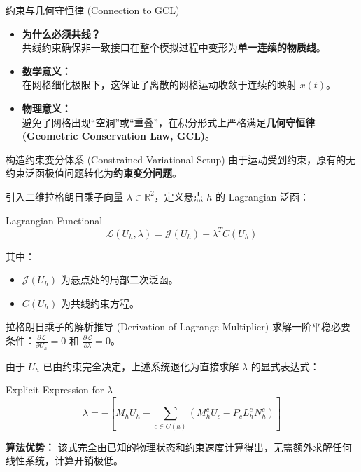 \documentclass{beamer}
\begin{document}
	\begin{frame}{约束与几何守恒律 (Connection to GCL)}
		\begin{itemize}
			\item \textbf{为什么必须共线？} \\
			共线约束确保非一致接口在整个模拟过程中变形为\textbf{单一连续的物质线}。
			\vspace{0.3cm}
			\item \textbf{数学意义：} \\
			在网格细化极限下，这保证了离散的网格运动收敛于连续的映射 $x(t)$。
			\vspace{0.3cm}
			\item \textbf{物理意义：} \\
			避免了网格出现“空洞”或“重叠”，在积分形式上严格满足\textbf{几何守恒律 (Geometric Conservation Law, GCL)}。
		\end{itemize}
	\end{frame}
	
	\begin{frame}{构造约束变分体系 (Constrained Variational Setup)}
		由于运动受到约束，原有的无约束泛函极值问题转化为\textbf{约束变分问题}。
		
		引入二维拉格朗日乘子向量 $\lambda \in \mathbb{R}^2$，定义悬点 $h$ 的 Lagrangian 泛函：
		\begin{block}{Lagrangian Functional}
			\begin{equation*}
				\mathcal{L}(U_h, \lambda) = \mathcal{J}(U_h) + \lambda^T C(U_h)
			\end{equation*}
		\end{block}
		
		其中：
		\begin{itemize}
			\item $\mathcal{J}(U_h)$ 为悬点处的局部二次泛函。
			\item $C(U_h)$ 为共线约束方程。
		\end{itemize}
	\end{frame}
	
	\begin{frame}{拉格朗日乘子的解析推导 (Derivation of Lagrange Multiplier)}
		求解一阶平稳必要条件：$\frac{\partial\mathcal{L}}{\partial U_h} = 0$ 和 $\frac{\partial\mathcal{L}}{\partial \lambda} = 0$。
		
		由于 $U_h$ 已由约束完全决定，上述系统退化为直接求解 $\lambda$ 的显式表达式：
		
		\begin{block}{Explicit Expression for $\lambda$}
			\begin{equation*}
				\lambda = - \left[ M_h U_h - \sum_{c\in C(h)} (M_h^c U_c - P_c L_h^c N_h^c) \right]
			\end{equation*}
		\end{block}
		
		\textbf{算法优势：} 该式完全由已知的物理状态和约束速度计算得出，\textcolor{deepblue}{无需额外求解任何线性系统}，计算开销极低。
	\end{frame}
	
\end{document}
